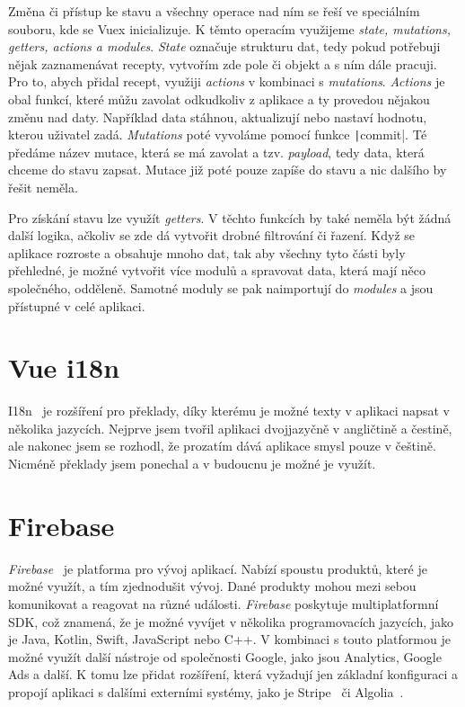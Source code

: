 Změna či přístup ke stavu a všechny operace nad ním se řeší ve speciálním souboru, kde se Vuex inicializuje. K těmto operacím využijeme \emph{state, mutations, getters, actions a modules}.
\emph{State} označuje strukturu dat, tedy pokud potřebuji nějak zaznamenávat recepty, vytvořím zde pole či objekt a s ním dále pracuji. Pro to, abych přidal recept, využiji \emph{actions} v kombinaci s
\emph{mutations}. \emph{Actions} je obal funkcí, které můžu zavolat odkudkoliv z aplikace a ty provedou nějakou změnu nad daty. Například data stáhnou, aktualizují nebo nastaví hodnotu, kterou uživatel
zadá. \emph{Mutations} poté vyvoláme pomocí funkce \texttt|commit|. Té předáme název mutace, která se má zavolat a tzv. \emph{payload}, tedy data, která chceme do stavu zapsat. Mutace již poté pouze zapíše
do stavu a nic dalšího by řešit neměla.

Pro získání stavu lze využít \emph{getters}. V těchto funkcích by také neměla být žádná další logika, ačkoliv se zde dá vytvořit drobné filtrování či řazení.
Když se aplikace rozroste a obsahuje mnoho dat, tak aby všechny tyto části byly přehledné, je možné vytvořit více modulů a spravovat data, která mají něco společného,
odděleně. Samotné moduly se pak naimportují do \emph{modules} a jsou přístupné v celé aplikaci.

\section{Vue i18n}
I18n~\cite{i18n} je rozšíření pro překlady, díky kterému je možné texty v aplikaci napsat v několika jazycích. Nejprve jsem tvořil aplikaci dvojjazyčně
v angličtině a čestině, ale nakonec jsem se rozhodl, že prozatím dává aplikace smysl pouze v češtině. Nicméně překlady jsem ponechal a v budoucnu
je možné je využít.

\section{Firebase}
\emph{Firebase}~\cite{Firebase} je platforma pro vývoj aplikací. Nabízí spoustu produktů, které je možné využít, a tím zjednodušit vývoj.
Dané produkty mohou mezi sebou komunikovat a reagovat na různé události. \emph{Firebase} poskytuje multiplatformní SDK, což znamená, že je
možné vyvíjet v několika programovacích jazycích, jako je Java, Kotlin, Swift, JavaScript nebo C++. V kombinaci s touto platformou je možné
využít další nástroje od společnosti Google, jako jsou Analytics, Google Ads a další. K tomu lze přidat rozšíření, která vyžadují jen základní
konfiguraci a propojí aplikaci s dalšími externími systémy, jako je Stripe~\cite{Stripe} či Algolia~\cite{Algolia}.

